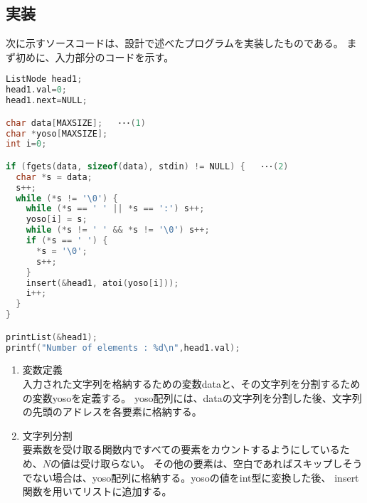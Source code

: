 \documentclass[a4j]{ltjsarticle}
\begin{document}
    \subsection{実装}
      次に示すソースコードは、設計で述べたプログラムを実装したものである。
      まず初めに、入力部分のコードを示す。
      \begin{lstlisting}[language=C,caption=課題1-1(入力部分)]
ListNode head1;
head1.val=0;
head1.next=NULL;

char data[MAXSIZE];   ･･･(1)
char *yoso[MAXSIZE];
int i=0;

if (fgets(data, sizeof(data), stdin) != NULL) {   ･･･(2)
  char *s = data;
  s++; 
  while (*s != '\0') {
    while (*s == ' ' || *s == ':') s++;
    yoso[i] = s;
    while (*s != ' ' && *s != '\0') s++;
    if (*s == ' ') {
      *s = '\0';
      s++;
    }
    insert(&head1, atoi(yoso[i]));
    i++;
  }
}

printList(&head1);
printf("Number of elements : %d\n",head1.val);
      \end{lstlisting}
      \begin{enumerate}
        \item 変数定義
        \\ \indent 入力された文字列を格納するための変数dataと、その文字列を分割するための変数yosoを定義する。
        yoso配列には、dataの文字列を分割した後、文字列の先頭のアドレスを各要素に格納する。
        \item 文字列分割
        \\ \indent 要素数を受け取る関数内ですべての要素をカウントするようにしているため、$N$の値は受け取らない。
        その他の要素は、空白であればスキップしそうでない場合は、yoso配列に格納する。yosoの値をint型に変換した後、
        insert関数を用いてリストに追加する。
      \end{enumerate}
\end{document}
